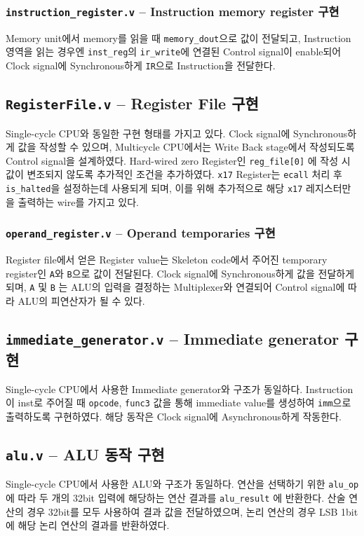\documentclass{scrartcl}
\begin{document}
\subsubsection{\texttt{instruction\_register.v} -- Instruction memory register 구현}
Memory unit에서 memory를 읽을 때 \texttt{memory\_dout}으로 값이 전달되고, Instruction 영역을 읽는 경우엔 \texttt{inst\_reg}의
\texttt{ir\_write}에 연결된 Control signal이 enable되어 Clock signal에 Synchronous하게 \texttt{IR}으로 Instruction을 전달한다.

\subsection{\texttt{RegisterFile.v} -- Register File 구현}
Single-cycle CPU와 동일한 구현 형태를 가지고 있다. Clock signal에 Synchronous하게 값을 작성할 수 있으며,
Multicycle CPU에서는 Write Back stage에서 작성되도록 Control signal을 설계하였다.
Hard-wired zero Register인 \texttt{reg\_file[0]} 에 작성 시 값이 변조되지 않도록 추가적인 조건을 추가하였다.
\texttt{x17} Register는 \texttt{ecall} 처리 후 \texttt{is\_halted}을 설정하는데 사용되게 되며, 이를 위해
추가적으로 해당 \texttt{x17} 레지스터만을 출력하는 wire를 가지고 있다.

\subsubsection{\texttt{operand\_register.v} -- Operand temporaries 구현}
Register file에서 얻은 Register value는 Skeleton code에서 주어진 temporary register인 \texttt{A}와 \texttt{B}으로
값이 전달된다. Clock signal에 Synchronous하게 값을 전달하게 되며, \texttt{A} 및 \texttt{B} 는 ALU의 입력을
결정하는 Multiplexer와 연결되어 Control signal에 따라 ALU의 피연산자가 될 수 있다.

\subsection{\texttt{immediate\_generator.v} -- Immediate generator 구현}
Single-cycle CPU에서 사용한 Immediate generator와 구조가 동일하다.
Instruction이 inst로 주어질 때 \texttt{opcode}, \texttt{func3} 값을 통해 immediate value를 생성하여
\texttt{imm}으로 출력하도록 구현하였다. 해당 동작은 Clock signal에 Asynchronous하게 작동한다.

\subsection{\texttt{alu.v} -- ALU 동작 구현}
Single-cycle CPU에서 사용한 ALU와 구조가 동일하다.
연산을 선택하기 위한 \texttt{alu\_op}에 따라 두 개의 32bit 입력에 해당하는 연산 결과를 \texttt{alu\_result} 에 반환한다.
산술 연산의 경우 32bit를 모두 사용하여 결과 값을 전달하였으며, 논리 연산의 경우 LSB 1bit에 해당 논리 연산의 결과를 반환하였다.
\end{document}

